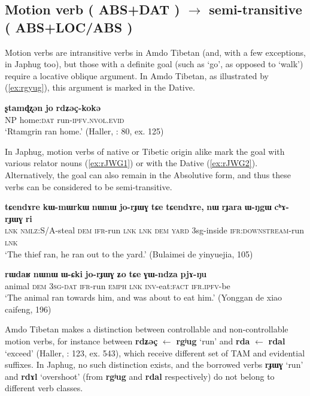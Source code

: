 \documentclass[oneside,a4paper,11pt]{article}
\makeatletter
\newcommand{\ipa}[1]{{\phon\textbf{\mbox{#1}}}} %
\newcommand{\refb}[1]{(\ref{#1})}
\def\fakesc#1{%
  \begingroup%
  \xdef\fake@name{\csname\curr@fontshape/\f@size\endcsname}%
  \fontsize{\fontdimen8\fake@name}{\baselineskip}\selectfont%
  \uppercase{#1}%
  \endgroup%
}
\makeatother
\begin{document}
\subsection{Motion verb (\fakesc{abs+dat}) $\rightarrow$ semi-transitive (\fakesc{abs+loc/abs})}  
Motion verbs are intransitive verbs in Amdo Tibetan (and, with a few exceptions, in Japhug too), but those with a definite goal (such as `go', as opposed to `walk') require a locative oblique argument. In Amdo Tibetan, as illustrated by \refb{ex:rgyug}, this argument is marked in the Dative.

\begin{exe}
\ex \label{ex:rgyug}
\gll
\ipa{ʂtamɖʐən} 	\ipa{jo} \ipa{rdʑəç-kokə} 	 \\
NP home:\textsc{dat} run-\textsc{ipfv.nvol.evid} \\
\glt `Rtamgrin ran home.' (Haller, \citeyear{haller04themchen}: 80, ex. 125)
\end{exe}

In Japhug, motion verbs of native or Tibetic origin alike mark the goal with various relator nouns (\ref{ex:rJWG1}) or with the Dative (\ref{ex:rJWG2}). Alternatively, the goal can also remain in the Absolutive form, and thus these verbs can be considered to be semi-transitive. 

\begin{exe}
\ex \label{ex:rJWG1}
\gll
\ipa{tɕendɤre}  	\ipa{kɯ-mɯrkɯ}  	\ipa{nɯnɯ}  	\ipa{jo-rɟɯɣ}  	\ipa{tɕe}  	\ipa{tɕendɤre,}  	\ipa{nɯ}  	\ipa{rɟara}  	\ipa{ɯ-ŋgɯ}  	\ipa{cʰɤ-rɟɯɣ}  	\ipa{ri}  \\
\textsc{lnk} \textsc{nmlz}:S/A-steal \textsc{dem} \textsc{ifr}-run \textsc{lnk} \textsc{lnk} \textsc{dem} \textsc{yard} 3sg-inside \textsc{ifr:downstream}-run \textsc{lnk} \\
\glt `The thief ran, he ran out to the yard.' (Bulaimei de yinyuejia, 105)
\end{exe}

\begin{exe}
\ex \label{ex:rJWG2}
\gll
\ipa{rɯdaʁ}  	\ipa{nɯnɯ}  	\ipa{ɯ-ɕki}  	\ipa{jo-rɟɯɣ}  	\ipa{ʑo}  	\ipa{tɕe}  	\ipa{ɣɯ-ndza}  	\ipa{pjɤ-ŋu}  \\
animal \textsc{dem} \textsc{3sg-dat} \textsc{ifr}-run \textsc{emph} \textsc{lnk} \textsc{inv}-eat:\textsc{fact} \textsc{ifr.ipfv}-be \\
\glt `The animal ran towards him, and was about to eat him.' (Yonggan de xiao caifeng, 196)
\end{exe}


Amdo Tibetan makes a distinction between controllable and non-controllable motion verbs, for instance between \ipa{rdʑəç} $\leftarrow$ \ipa{rgʲug} `run' and \ipa{rda} $\leftarrow$ \ipa{rdal} `exceed' (Haller, \citeyear{haller04themchen}: 123, ex. 543), which receive different set of TAM and evidential suffixes. In Japhug, no such distinction exists, and  the borrowed verbs \ipa{rɟɯɣ} `run' and \ipa{rdɤl} `overshoot' (from \ipa{rgʲug} and \ipa{rdal} respectively) do not belong to different verb classes.
\end{document}
